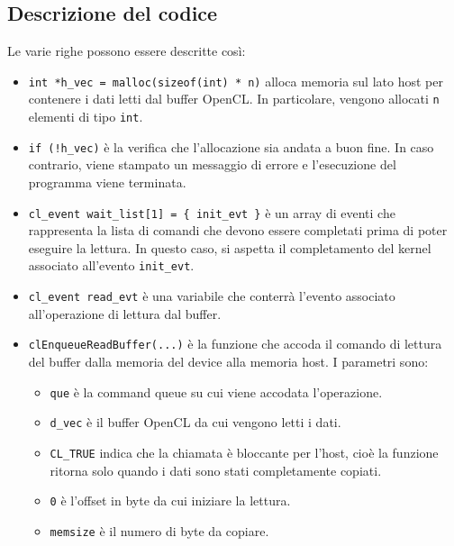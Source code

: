 \subsection*{Descrizione del codice}
Le varie righe possono essere descritte così:
\begin{itemize}
    \item \texttt{int *h\_vec = malloc(sizeof(int) * n)} alloca memoria sul lato host per contenere i dati letti dal buffer OpenCL. In particolare, vengono allocati \texttt{n} elementi di tipo \texttt{int}.
    
    \item \texttt{if (!h\_vec)} è la verifica che l’allocazione sia andata a buon fine. In caso contrario, viene stampato un messaggio di errore e l’esecuzione del programma viene terminata.
    
    \item \texttt{cl\_event wait\_list[1] = \{ init\_evt \}} è un array di eventi che rappresenta la lista di comandi che devono essere completati prima di poter eseguire la lettura. In questo caso, si aspetta il completamento del kernel associato all’evento \texttt{init\_evt}.
    
    \item \texttt{cl\_event read\_evt} è una variabile che conterrà l’evento associato all’operazione di lettura dal buffer.
    
    \item \texttt{clEnqueueReadBuffer(...)} è la funzione che accoda il comando di lettura del buffer dalla memoria del device alla memoria host. I parametri sono:
    \begin{itemize}
        \item \texttt{que} è la command queue su cui viene accodata l’operazione.
        
        \item \texttt{d\_vec} è il buffer OpenCL da cui vengono letti i dati.
        
        \item \texttt{CL\_TRUE} indica che la chiamata è bloccante per l’host, cioè la funzione ritorna solo quando i dati sono stati completamente copiati.
        
        \item \texttt{0} è l’offset in byte da cui iniziare la lettura.
        
        \item \texttt{memsize} è il numero di byte da copiare.
        

\end{itemize}
\end{itemize}
